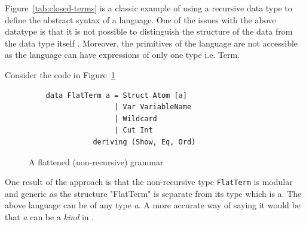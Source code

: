 \documentclass[thesis-solanki.tex]{subfiles}
\begin{document}
Figure~\ref{tab:closed-terms} is a classic example of using a recursive data type to define the
abstract syntax of a language.
One of the issues with the above datatype is that it is not possible to distinguish the structure of the data from the
data type itself \cite{sheard2004two}.
Moreover, the primitives of the language
are not accessible as the language can have expressions of only one
type i.e.
Term.

Consider the code in Figure~\ref{tab:non-recurse}
\begin{figure}
  \begin{verbatim}
    data FlatTerm a = Struct Atom [a]
                    | Var VariableName
                    | Wildcard
                    | Cut Int
               deriving (Show, Eq, Ord)
  \end{verbatim}
  \caption{A flattened (non-recursive) grammar}
  \label{tab:non-recurse}
\end{figure}

One result of the approach is that the non-recursive type
\texttt{FlatTerm} is modular and generic as the structure
"FlatTerm"
is separate
from its
type which is a.
The above language can be of any type \textit{a}. A more accurate way of saying it would be that \textit{a} can be a \textit{kind} in
.
\end{document}
